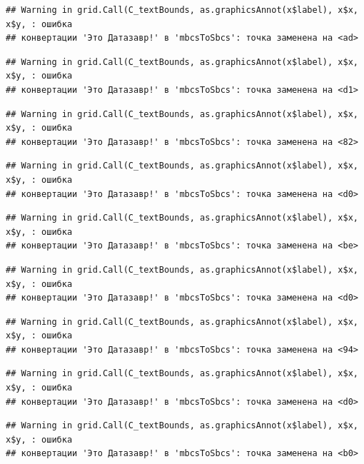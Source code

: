 \documentclass[]{book}
\begin{document}
\begin{verbatim}
## Warning in grid.Call(C_textBounds, as.graphicsAnnot(x$label), x$x, x$y, : ошибка
## конвертации 'Это Датазавр!' в 'mbcsToSbcs': точка заменена на <ad>
\end{verbatim}

\begin{verbatim}
## Warning in grid.Call(C_textBounds, as.graphicsAnnot(x$label), x$x, x$y, : ошибка
## конвертации 'Это Датазавр!' в 'mbcsToSbcs': точка заменена на <d1>
\end{verbatim}

\begin{verbatim}
## Warning in grid.Call(C_textBounds, as.graphicsAnnot(x$label), x$x, x$y, : ошибка
## конвертации 'Это Датазавр!' в 'mbcsToSbcs': точка заменена на <82>
\end{verbatim}

\begin{verbatim}
## Warning in grid.Call(C_textBounds, as.graphicsAnnot(x$label), x$x, x$y, : ошибка
## конвертации 'Это Датазавр!' в 'mbcsToSbcs': точка заменена на <d0>
\end{verbatim}

\begin{verbatim}
## Warning in grid.Call(C_textBounds, as.graphicsAnnot(x$label), x$x, x$y, : ошибка
## конвертации 'Это Датазавр!' в 'mbcsToSbcs': точка заменена на <be>
\end{verbatim}

\begin{verbatim}
## Warning in grid.Call(C_textBounds, as.graphicsAnnot(x$label), x$x, x$y, : ошибка
## конвертации 'Это Датазавр!' в 'mbcsToSbcs': точка заменена на <d0>
\end{verbatim}

\begin{verbatim}
## Warning in grid.Call(C_textBounds, as.graphicsAnnot(x$label), x$x, x$y, : ошибка
## конвертации 'Это Датазавр!' в 'mbcsToSbcs': точка заменена на <94>
\end{verbatim}

\begin{verbatim}
## Warning in grid.Call(C_textBounds, as.graphicsAnnot(x$label), x$x, x$y, : ошибка
## конвертации 'Это Датазавр!' в 'mbcsToSbcs': точка заменена на <d0>
\end{verbatim}

\begin{verbatim}
## Warning in grid.Call(C_textBounds, as.graphicsAnnot(x$label), x$x, x$y, : ошибка
## конвертации 'Это Датазавр!' в 'mbcsToSbcs': точка заменена на <b0>
\end{verbatim}
\end{document}
